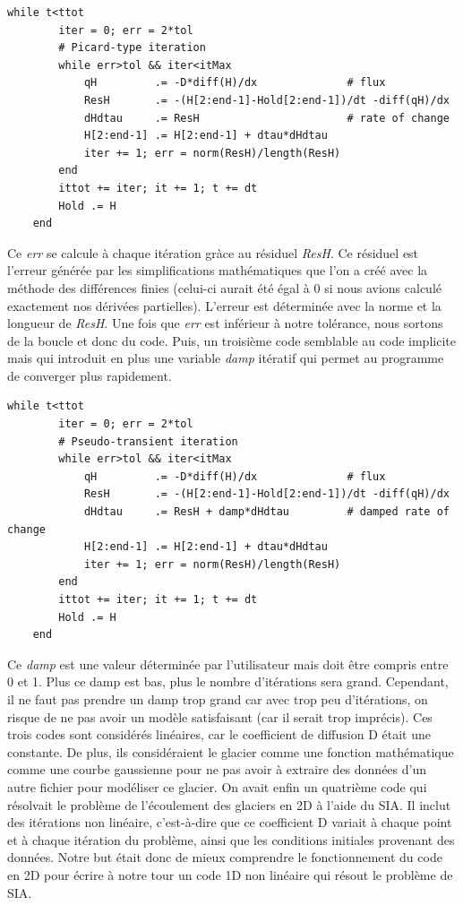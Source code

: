 \documentclass{article}
\begin{document}
\begin{verbatim}
while t<ttot
        iter = 0; err = 2*tol
        # Picard-type iteration
        while err>tol && iter<itMax
            qH         .= -D*diff(H)/dx              # flux
            ResH       .= -(H[2:end-1]-Hold[2:end-1])/dt -diff(qH)/dx
            dHdtau     .= ResH                       # rate of change
            H[2:end-1] .= H[2:end-1] + dtau*dHdtau   
            iter += 1; err = norm(ResH)/length(ResH)
        end
        ittot += iter; it += 1; t += dt
        Hold .= H
    end
\end{verbatim}
Ce \textit{err} se calcule à chaque itération gràce au résiduel \textit{ResH}. Ce résiduel est l'erreur générée par les simplifications mathématiques que l'on a créé avec la méthode des différences finies (celui-ci aurait été égal à 0 si nous avions calculé exactement nos dérivées partielles). L'erreur est déterminée avec la norme et la longueur de \textit{ResH}. Une fois que \textit{err} est inférieur à notre tolérance, nous sortons de la boucle et donc du code.
\newline
\newline
 Puis, un troisième code semblable au code implicite mais qui introduit en plus une variable \textit{damp} itératif qui permet au programme de converger plus rapidement.
\begin{verbatim}
while t<ttot
        iter = 0; err = 2*tol
        # Pseudo-transient iteration
        while err>tol && iter<itMax
            qH         .= -D*diff(H)/dx              # flux
            ResH       .= -(H[2:end-1]-Hold[2:end-1])/dt -diff(qH)/dx
            dHdtau     .= ResH + damp*dHdtau         # damped rate of change
            H[2:end-1] .= H[2:end-1] + dtau*dHdtau   
            iter += 1; err = norm(ResH)/length(ResH)
        end
        ittot += iter; it += 1; t += dt
        Hold .= H
    end
\end{verbatim}
Ce \textit{damp} est une valeur déterminée par l'utilisateur mais doit être compris entre 0 et 1. Plus ce damp est bas, plus le nombre d'itérations sera grand. Cependant, il ne faut pas prendre un damp trop grand car avec trop peu d'itérations, on risque de ne pas avoir un modèle satisfaisant (car il serait trop imprécis).
\newpage
Ces trois codes sont considérés linéaires, car le coefficient de diffusion D était une constante. De plus, ils considéraient le glacier comme une fonction mathématique comme une courbe gaussienne pour ne pas avoir à extraire des données d'un autre fichier pour modéliser ce glacier.
\newline
\newline
On avait enfin un quatrième code qui résolvait le problème de l'écoulement des glaciers en 2D à l'aide du SIA. Il inclut des itérations non linéaire, c'est-à-dire que ce coefficient D variait à chaque point et à chaque itération du problème, ainsi que les conditions initiales provenant des données. Notre but était donc de mieux comprendre le fonctionnement du code en 2D pour écrire à notre tour un code 1D non linéaire qui résout le problème de SIA.
\newpage
\end{document}
